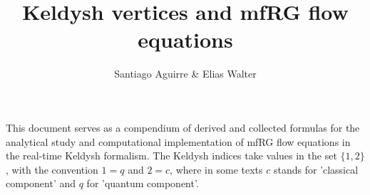 \documentclass[12pt,a4paper,roman]{article}
\begin{document}
%
\title{Keldysh vertices and mfRG flow equations}
%
%
\author{Santiago Aguirre \& Elias Walter}
%
%
%
\maketitle              %
%

%
%
%
This document serves as a compendium of derived and collected formulas for the analytical study and computational implementation of mfRG flow equations in the real-time Keldysh formalism.
The Keldysh indices take values in the set $\{1,2\}$, with the convention $1 = q$ and $2=c$, where in some texts $c$ stands for 'classical component' and $q$ for 'quantum component'.
\end{document}

